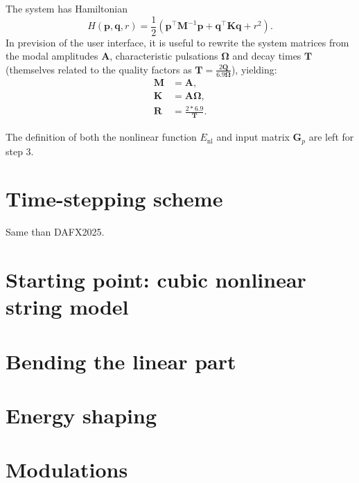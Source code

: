 \documentclass[9pt]{scrartcl}
\newcommand{\mat}[1]{\mathbf {#1}}
\begin{document}
  The system has Hamiltonian
  \begin{equation}
     H(\mat p, \mat q, r) = \frac{1}{2} \left(\mat p^\intercal \mat M^{-1} \mat p + \mat q^\intercal \mat K \mat q + r^2\right).
  \end{equation}
  In prevision of the user interface, it is useful to rewrite the system matrices from the modal amplitudes $\mat A$, characteristic pulsations $\boldsymbol{\Omega}$ and decay times $\mat T$ (themselves related to the quality factors as $\mat T = \frac{2 \mat Q}{6.9 \boldsymbol{\Omega}}$), yielding:
  \begin{align}
    \mat M& = \mat A, \\
    \mat K& = \mat A \boldsymbol{\Omega},\\
    \mat R& = \frac{2 * 6.9}{\mat T}.
  \end{align}

  The definition of both the nonlinear function $E_{\mathrm{nl}}$ and input matrix $\mat G_p$ are left for step 3.

  \section{Time-stepping scheme}

  Same than DAFX2025.

  \section{Starting point: cubic nonlinear string model}

  \section{Bending the linear part}

  \section{Energy shaping}

  \section{Modulations}
\end{document}
